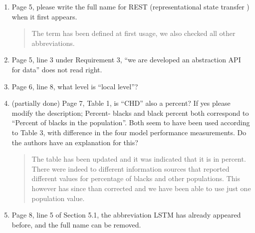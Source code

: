 \begin{enumerate}
    
\item \DOIT Page 5, please write the full name for REST (representational state transfer ) when it first appears.

\begin{quote}
    The term has been defined at first usage, we also checked all other abbreviations.


\end{quote}


\item \DOIT Page 5, line 3 under Requirement 3, “we are developed an abstraction API for data” does not read right.

\begin{quote}
\end{quote}

\item \DOIT Page 6, line 8, what level is “local level”?

\begin{quote}
\end{quote}


\item (partially done) Page 7, Table 1, is “CHD” also a percent? If yes please modify the description; Percent- blacks and black percent both correspond to “Percent of blacks in the population”. Both seem to have been used according to Table 3, with difference in the four model performance measurements. Do the authors have an explanation for this?

    \begin{quote}
    The table has been updated and it was indicated that it is in percent. There were indeed to different information sources that reported different values for percentage of blacks and other populations. This however has since than corrected and we have been able to use just one population value.

    \end{quote}


\item \DOIT Page 8, line 5 of Section 5.1, the abbreviation LSTM has already appeared before, and the full name can be removed.

    \begin{quote}
    \end{quote}


\end{enumerate}
